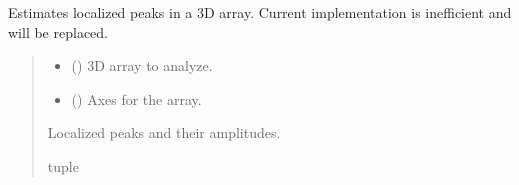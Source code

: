 \documentclass[letterpaper,10pt,english]{sphinxmanual}
\begin{document}
\begin{fulllineitems}
\label{\detokenize{source/stattools:stattools.estimate_localized_peaks}}
\pysigstartsignatures
\pysiglinewithargsret
{}
{\sphinxparamcomma {}}
{}
\pysigstopsignatures
\sphinxAtStartPar
Estimates localized peaks in a 3D array.
Current implementation is inefficient and will be replaced.
\begin{quote}\begin{description}
\begin{itemize}
\item {} 
\sphinxAtStartPar
{} () \textendash{} 3D array to analyze.

\item {} 
\sphinxAtStartPar
{} () \textendash{} Axes for the array.

\end{itemize}

\sphinxAtStartPar
Localized peaks and their amplitudes.

\sphinxAtStartPar
tuple

\end{description}\end{quote}

\end{fulllineitems}

\end{document}
